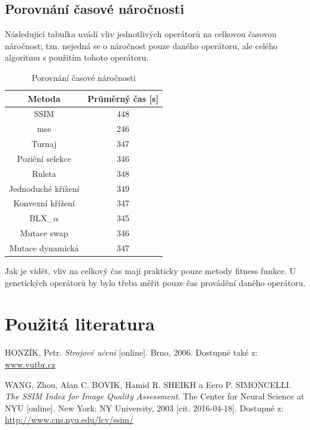 \documentclass[a4paper,11pt]{scrartcl}
\begin{document}
\subsection{Porovnání časové náročnosti}

Následující tabulka uvádí vliv jednotlivých operátorů na celkovou časovou náročnost; tzn. nejedná se o náročnost pouze daného operátoru, ale celého algoritmu s použitím tohoto operátoru.

\begin{table}[!h]
  \caption{Porovnání časové náročnosti}
  \label{tab:por}

  \begin{center}
    \begin{tabular}{|c|c|}
    \hline
       Metoda & Průměrný čas [s] \\
       \hline
       SSIM & 448 \\
        mse &
        246 \\
        Turnaj &
        347 \\
        Poziční selekce &
        346 \\
        Ruleta &
        348 \\
        Jednoduché křížení &
        349 \\
        Konvexní křížení &
        347 \\
        BLX\_$\alpha$ &
        345 \\
        Mutace swap &
        346 \\
        Mutace dynamická &
        347 \\
        \hline
    \end{tabular}
  \end{center}
\end{table}

Jak je vidět, vliv na celkový čas mají prakticky pouze metody fitness funkce. U genetických operátorů by bylo třeba měřit pouze čas provádění daného operátoru.

\section{Použitá literatura}

\begin{thebibliography}{9}
 
HONZÍK, Petr. \emph{Strojové učení} [online]. Brno, 2006. Dostupné také z: \url{www.vutbr.cz}

WANG, Zhou, Alan C. BOVIK, Hamid R. SHEIKH a Eero P. SIMONCELLI. \emph{The SSIM Index for Image Quality Assessment}. The Center for Neural Science at NYU [online]. New York: NY University, 2003 [cit. 2016-04-18]. Dostupné z: \url{http://www.cns.nyu.edu/lcv/ssim/}

\end{thebibliography}
\end{document}
